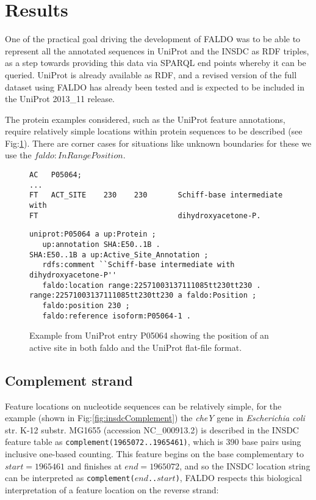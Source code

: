 \section*{Results}
One of the practical goal driving the development of FALDO was to be able
to represent all the annotated sequences in UniProt and the INSDC as RDF
triples, as a step towards providing this data via SPARQL end points whereby
it can be queried.
UniProt is already available as RDF, and a revised version of the full
dataset using FALDO has already been tested and is expected to be included
in the UniProt 2013\_11 release.

The protein examples considered, such as the UniProt feature annotations,
require relatively simple locations within protein sequences to be described (see Fig:\ref{fig:UniProt}).
There are corner cases for situations like unknown boundaries for these we use the $faldo:InRangePosition$.

\begin{figure}
\begin{verbatim}
AC   P05064;
...
FT   ACT_SITE    230    230       Schiff-base intermediate with
FT                                dihydroxyacetone-P.
\end{verbatim}
\begin{verbatim}
uniprot:P05064 a up:Protein ;
   up:annotation SHA:E50..1B .
SHA:E50..1B a up:Active_Site_Annotation ;
   rdfs:comment ``Schiff-base intermediate with dihydroxyacetone-P''
   faldo:location range:22571003137111085tt230tt230 .
range:22571003137111085tt230tt230 a faldo:Position ;
   faldo:position 230 ;
   faldo:reference isoform:P05064-1 .
\end{verbatim}
\caption{Example from UniProt entry P05064 showing the position of an active site in both faldo and the UniProt flat-file format.}
\label{fig:UniProt}
\end{figure}
\subsection*{Complement strand}
Feature locations on nucleotide sequences can be relatively simple,
for the example (shown in Fig:\ref{fig:insdcComplement}) the \textit{cheY} gene in
\textit{Escherichia coli} str. K-12 substr. MG1655 (accession NC\_000913.2)
is described in the INSDC feature table as \texttt{complement(1965072..1965461)},
which is 390 base pairs using inclusive one-based counting.
This feature begins on the base complementary to $start = 1965461$
and finishes at $end = 1965072$, and so the INSDC location string
can be interpreted as \texttt{complement($end$..$start$)},
FALDO respects this biological interpretation of a feature location
on the reverse strand:

